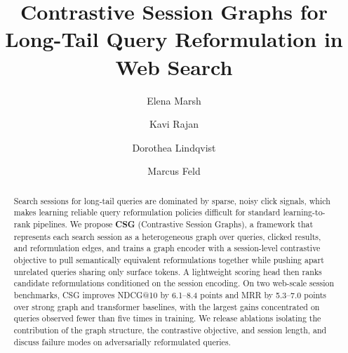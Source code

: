 \documentclass[sigconf,anonymous,review]{acmart}
\begin{document}
\title{Contrastive Session Graphs for Long-Tail Query Reformulation in Web Search}

\author{Elena Marsh}

\author{Kavi Rajan}

\author{Dorothea Lindqvist}

\author{Marcus Feld}

\renewcommand{\shortauthors}{Marsh et al.}

\begin{abstract}
Search sessions for long-tail queries are dominated by sparse, noisy click signals, which
makes learning reliable query reformulation policies difficult for standard learning-to-rank
pipelines. We propose \textbf{CSG} (Contrastive Session Graphs), a framework that represents
each search session as a heterogeneous graph over queries, clicked results, and reformulation
edges, and trains a graph encoder with a session-level contrastive objective to pull
semantically equivalent reformulations together while pushing apart unrelated queries sharing
only surface tokens. A lightweight scoring head then ranks candidate reformulations
conditioned on the session encoding. On two web-scale session benchmarks, CSG improves
NDCG@10 by 6.1--8.4 points and MRR by 5.3--7.0 points over strong graph and transformer
baselines, with the largest gains concentrated on queries observed fewer than five times in
training. We release ablations isolating the contribution of the graph structure, the
contrastive objective, and session length, and discuss failure modes on adversarially
reformulated queries.
\end{abstract}

\end{document}
